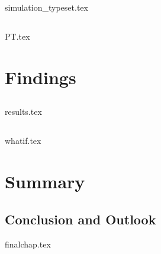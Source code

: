 \documentclass[UKenglish]{texmex/uiomasterthesis}
\begin{document}
{{simulation_typeset.tex}


\chapter{}\label{chap:PT}
    {{PT.tex}}

















\part{Findings}\label{part:findings}



\chapter{}\label{chap:results}
    {{results.tex}}


\chapter{}\label{chap:whatif}
    {{whatif.tex}}








\part*{Summary} %


\chapter{Conclusion and Outlook}
    {{finalchap.tex}}
}
\end{document}
